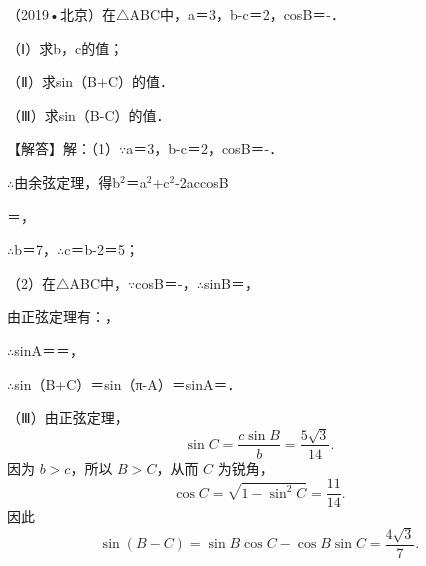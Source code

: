 \begin{question}
（2019•北京）在$\triangle$ABC中，a＝3，b-c＝2，cosB＝-\allowbreak{}．\par
（Ⅰ）求b，c的值；\par
（Ⅱ）求sin（B+C）的值．\par
（Ⅲ）求sin（B-C）的值．\par
\begin{solution}
【解答】解：（1）$\because$a＝3，b-c＝2，cosB＝-\allowbreak{}．\par
$\therefore$由余弦定理，得b$^{2}$＝a$^{2}$+c$^{2}$-2accosB\par
＝\allowbreak{}，\par
$\therefore$b＝7，$\therefore$c＝b-2＝5；\par
（2）在$\triangle$ABC中，$\because$cosB＝-\allowbreak{}，$\therefore$sinB＝\allowbreak{}，\par
由正弦定理有：\allowbreak{}，\par
$\therefore$sinA＝\allowbreak{}＝\allowbreak{}，\par
$\therefore$sin（B+C）＝sin（π-A）＝sinA＝\allowbreak{}．\par
（Ⅲ）由正弦定理，
\[
\sin C=\frac{c\sin B}{b}=\frac{5\sqrt3}{14}.
\]
因为 $b>c$，所以 $B>C$，从而 $C$ 为锐角，
\[
\cos C=\sqrt{1-\sin^2C}=\frac{11}{14}.
\]
因此
\[
\sin(B-C)=\sin B\cos C-\cos B\sin C
=\frac{4\sqrt3}{7}.
\]
\end{solution}
\end{question}

